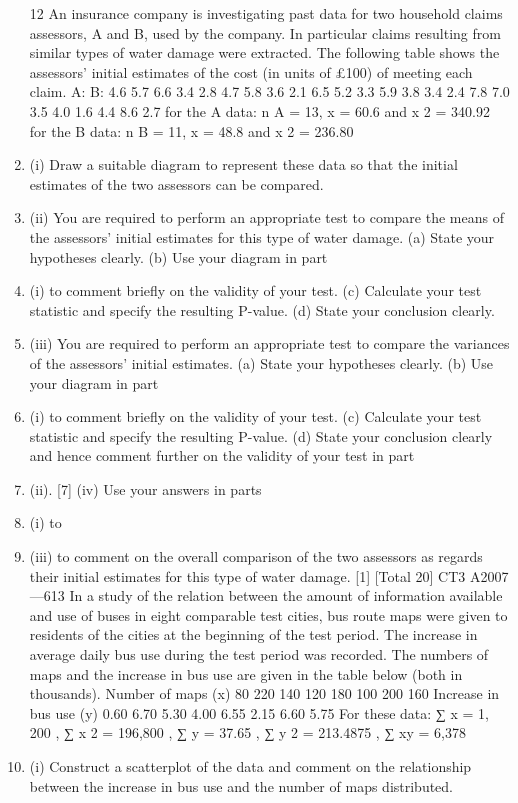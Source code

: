 \documentclass[a4paper,12pt]{article}
\begin{document}
\begin{enumerate}


12
An insurance company is investigating past data for two household claims assessors,
A and B, used by the company. In particular claims resulting from similar types of
water damage were extracted. The following table shows the assessors’ initial
estimates of the cost (in units of £100) of meeting each claim.
A:
B:
4.6
5.7
6.6
3.4
2.8
4.7
5.8
3.6
2.1
6.5
5.2
3.3
5.9
3.8
3.4
2.4
7.8
7.0
3.5
4.0
1.6
4.4
8.6
2.7
for the A data: n A = 13, \sum x = 60.6 and \sum x 2 = 340.92
for the B data: n B = 11, \sum x = 48.8 and \sum x 2 = 236.80
\item (i) Draw a suitable diagram to represent these data so that the initial estimates of
the two assessors can be compared.

\item (ii) You are required to perform an appropriate test to compare the means of the
assessors’ initial estimates for this type of water damage.
(a) State your hypotheses clearly.
(b) Use your diagram in part \item (i) to comment briefly on the validity of your
test.
(c) Calculate your test statistic and specify the resulting P-value.
(d) State your conclusion clearly.
\item (iii)
You are required to perform an appropriate test to compare the variances of
the assessors’ initial estimates.
(a) State your hypotheses clearly.
(b) Use your diagram in part \item (i) to comment briefly on the validity of your
test.
(c) Calculate your test statistic and specify the resulting P-value.
(d) State your conclusion clearly and hence comment further on the validity of your test in part \item (ii).
[7]
(iv)
Use your answers in parts \item (i) to \item (iii) to comment on the overall comparison of the two assessors as regards their initial estimates for this type of water damage.
[1]
[Total 20]
CT3 A2007—613
In a study of the relation between the amount of information available and use of
buses in eight comparable test cities, bus route maps were given to residents of the cities at the beginning of the test period. The increase in average daily bus use during the test period was recorded. The numbers of maps and the increase in bus use are
given in the table below (both in thousands).
Number of maps (x)
80 220 140 120 180 100 200 160
Increase in bus use (y) 0.60 6.70 5.30 4.00 6.55 2.15 6.60 5.75
For these data:
∑ x = 1, 200 , ∑ x 2 = 196,800 , ∑ y = 37.65 , ∑ y 2 = 213.4875 , ∑ xy = 6,378
\item (i) Construct a scatterplot of the data and comment on the relationship between
the increase in bus use and the number of maps distributed.


\end{enumerate}
\end{document}
